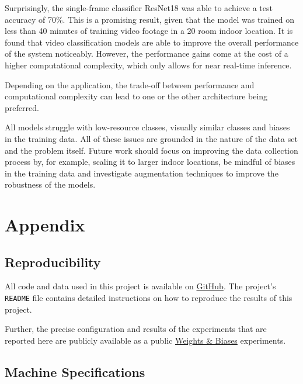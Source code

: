 \documentclass[a4paper]{article}
\begin{document}
Surprisingly, the single-frame classifier ResNet18 was able to achieve a test
accuracy of 70\%. This is a promising result, given that the model was trained
on less than 40 minutes of training video footage in a 20 room indoor
location. It is found that video classification models are able to improve the
overall performance of the system noticeably. However, the performance gains
come at the cost of a higher computational complexity, which only allows for
near real-time inference. 

Depending on the application, the trade-off between performance and
computational complexity can lead to one or the other architecture being
preferred.

All models struggle with low-resource classes, visually similar classes and
biases in the training data. All of these issues are grounded in the nature of
the data set and the problem itself. Future work should focus on improving the 
data collection process by, for example, scaling it to larger indoor locations,
be mindful of biases in the training data and investigate augmentation
techniques to improve the robustness of the models.



\newpage




\newpage
\section{Appendix} %
\label{sec:appendix}

\subsection{Reproducibility} %
\label{sub:reproducibility}

All code and data used in this project is available on
\href{https://github.com/mikasenghaas/bsc}{GitHub}. The project's
\texttt{README} file contains detailed instructions on how to reproduce the
results of this project.

Further, the precise configuration and results of the experiments that are
reported here are publicly available as a public
\href{https://wandb.ai/mikasenghaas/bsc}{Weights \& Biases} experiments.


\subsection{Machine Specifications} %
\label{sub:machine-specs}
\end{document}
